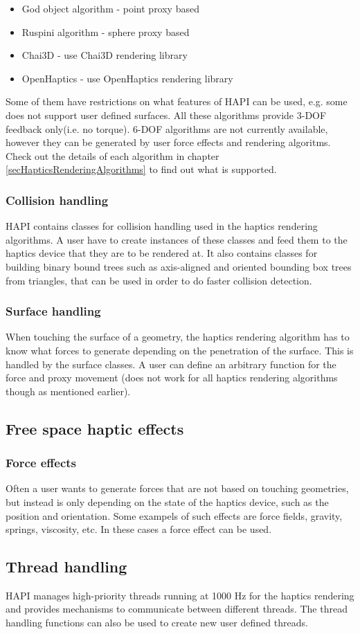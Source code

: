 \begin{itemize}
\item God object algorithm - point proxy based
\item Ruspini algorithm - sphere proxy based
\item Chai3D - use Chai3D rendering library
\item OpenHaptics - use OpenHaptics rendering library
\end{itemize}

Some of them have restrictions on what features of HAPI can be used, e.g. some does not support user defined surfaces. All these algorithms provide 3-DOF feedback only(i.e. no torque). 6-DOF algorithms are not currently available, however they can be generated by user force effects and rendering algoritms. Check out the details of each algorithm in chapter \ref{secHapticsRenderingAlgorithms} to find out what is supported.

\subsubsection{Collision handling}
HAPI contains classes for collision handling used in the
haptics rendering algorithms. A user have to create instances of these
classes and feed them to the haptics device that they are to be
rendered at. It also contains classes for building binary bound trees
such as axis-aligned and oriented bounding box trees from triangles,
that can be used in order to do faster collision detection. 

\subsubsection{Surface handling}
When touching the surface of a geometry, the haptics rendering
algorithm has to know what forces to generate depending on the
penetration of the surface. This is handled by the surface classes. A
user can define an arbitrary function for the force and proxy
movement (does not work for all haptics rendering algorithms though as
mentioned earlier).

\subsection{Free space haptic effects}

\subsubsection{Force effects}
Often a user wants to generate forces that are not based on
touching geometries, but instead is only depending on the state of the haptics device, such as the position and orientation. Some exampels of such effects are force fields, gravity, springs, viscosity, etc. In these cases a force effect can be used.

\subsection{Thread handling}
HAPI manages high-priority threads running at 1000 Hz for the haptics
rendering and provides mechanisms to communicate between different
threads. The thread handling functions can also be used to create new
user defined threads.
